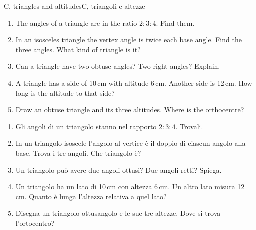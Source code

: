 \documentclass[10pt,a4paper,oneside]{book}
\begin{document}
\begin{exercise}{C, triangles and altitudes}{C, triangoli e altezze}
\begin{enumerate}[label=\textbf{C\arabic*.}, leftmargin=2.2em]
\item The angles of a triangle are in the ratio $2 : 3 : 4$. Find them.
\item In an isosceles triangle the vertex angle is twice each base angle. Find the three angles. What kind of triangle is it?
\item Can a triangle have two obtuse angles? Two right angles? Explain.
\item A triangle has a side of 10\,cm with altitude 6\,cm. Another side is 12\,cm. How long is the altitude to that side?
\item Draw an obtuse triangle and its three altitudes. Where is the orthocentre?
\end{enumerate}
\tcblower
\begin{enumerate}[label=\textbf{C\arabic*.}, leftmargin=2.2em]
\item Gli angoli di un triangolo stanno nel rapporto $2 : 3 : 4$. Trovali.
\item In un triangolo isoscele l'angolo al vertice è il doppio di ciascun angolo alla base. Trova i tre angoli. Che triangolo è?
\item Un triangolo può avere due angoli ottusi? Due angoli retti? Spiega.
\item Un triangolo ha un lato di 10\,cm con altezza 6\,cm. Un altro lato misura 12\,cm. Quanto è lunga l'altezza relativa a quel lato?
\item Disegna un triangolo ottusangolo e le sue tre altezze. Dove si trova l'ortocentro?
\end{enumerate}
\end{exercise}
\end{document}
